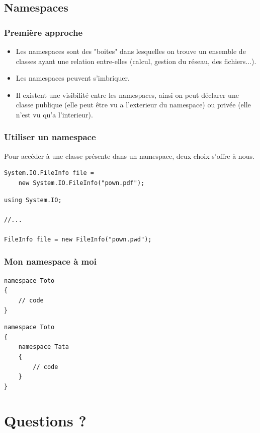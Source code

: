 \documentclass{beamer}
\begin{document}
\subsection{Namespaces}

\begin{frame}
\frametitle{Première approche}
\begin{itemize}
\item Les namespaces sont des "boites" dans lesquelles on trouve un ensemble de classes ayant une relation entre-elles (calcul, gestion du réseau, des fichiers...).
\item Les namespaces peuvent s'imbriquer.
\item Il existent une visibilité entre les namespaces, ainsi on peut déclarer une classe publique (elle peut être vu a l'exterieur du namespace) ou privée (elle n'est vu qu'a l'interieur).

\end{itemize}
\end{frame}

\begin{frame}[fragile]
\frametitle{Utiliser un namespace}
Pour accéder à une classe présente dans un namespace, deux choix s'offre à nous.
\begin{lstlisting}
System.IO.FileInfo file = 
    new System.IO.FileInfo("pown.pdf");
\end{lstlisting}
\pause
\begin{lstlisting}
using System.IO;

//...

FileInfo file = new FileInfo("pown.pwd");
\end{lstlisting}
\end{frame}

\begin{frame}[fragile]
\frametitle{Mon namespace à moi}
\begin{lstlisting}
namespace Toto
{
    // code
}
\end{lstlisting}
\pause
\begin{lstlisting}
namespace Toto
{
    namespace Tata
    {
        // code
    }
}
\end{lstlisting}
\end{frame}

\section{Questions ?}
\end{document}
